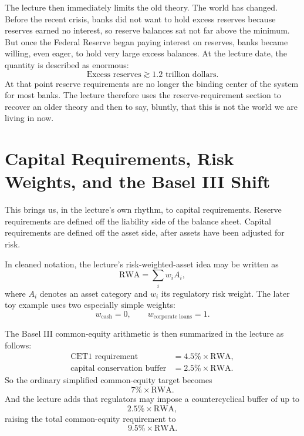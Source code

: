 The lecture then immediately limits the old theory. The world has changed. Before the recent crisis, banks did not want to hold excess reserves because reserves earned no interest, so reserve balances sat not far above the minimum. But once the Federal Reserve began paying interest on reserves, banks became willing, even eager, to hold very large excess balances. At the lecture date, the quantity is described as enormous:
\begin{equation}
\text{Excess reserves} \gtrsim 1.2 \text{ trillion dollars}.
\end{equation}
At that point reserve requirements are no longer the binding center of the system for most banks. The lecture therefore uses the reserve-requirement section to recover an older theory and then to say, bluntly, that this is not the world we are living in now.

\section{Capital Requirements, Risk Weights, and the Basel III Shift}

This brings us, in the lecture's own rhythm, to capital requirements. Reserve requirements are defined off the liability side of the balance sheet. Capital requirements are defined off the asset side, after assets have been adjusted for risk.

In cleaned notation, the lecture's risk-weighted-asset idea may be written as
\begin{equation}
\text{RWA} = \sum_i w_i A_i,
\end{equation}
where \(A_i\) denotes an asset category and \(w_i\) its regulatory risk weight. The later toy example uses two especially simple weights:
\begin{equation}
w_{\text{cash}} = 0, \qquad w_{\text{corporate loans}} = 1.
\end{equation}

The Basel III common-equity arithmetic is then summarized in the lecture as follows:
\begin{align}
\text{CET1 requirement} &= 4.5\% \times \text{RWA}, \\
\text{capital conservation buffer} &= 2.5\% \times \text{RWA}.
\end{align}
So the ordinary simplified common-equity target becomes
\begin{equation}
7\% \times \text{RWA}.
\end{equation}
And the lecture adds that regulators may impose a countercyclical buffer of up to
\begin{equation}
2.5\% \times \text{RWA},
\end{equation}
raising the total common-equity requirement to
\begin{equation}
9.5\% \times \text{RWA}.
\end{equation}

